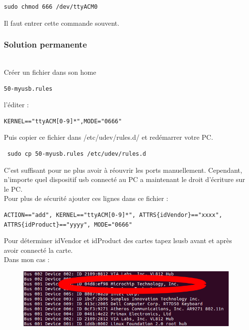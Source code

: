 \documentclass{article}
\begin{document}
\begin{verbatim}
sudo chmod 666 /dev/ttyACM0
\end{verbatim}
Il faut entrer cette commande souvent. \\
\subsubsection{Solution permanente}\\

Créer un fichier dans son home

\begin{verbatim}
50-myusb.rules
\end{verbatim} 

l'éditer : 

\begin{verbatim}
KERNEL=="ttyACM[0-9]*",MODE="0666"
\end{verbatim}

Puis copier ce fichier dans /etc/udev/rules.d/ et redémarrer votre PC.

\begin{verbatim}
 sudo cp 50-myusb.rules /etc/udev/rules.d
\end{verbatim}
C'est suffisant pour ne plus avoir à réouvrir les ports manuellement. Cependant, n'importe quel dispositif usb connecté au PC a maintenant le droit d'écriture sur le PC. \\

Pour plus de sécurité ajouter ces lignes dans ce fichier :

\begin{verbatim}
ACTION=="add", KERNEL=="ttyACM[0-9]*", ATTRS{idVendor}=="xxxx", 
ATTRS{idProduct}=="yyyy", MODE="0666"
\end{verbatim}
 
 Pour déterminer idVendor et idProduct des cartes tapez lsusb avant et après avoir connecté la carte. \\

 Dans mon cas :
 
 \begin{figure}[H]
\begin{center}
\advance\leftskip-3cm
\advance\rightskip-3cm
\includegraphics[keepaspectratio=true,scale=0.5]{lsusb.png}
\label{visina8}
\end{center}\end{figure}
\end{document}
